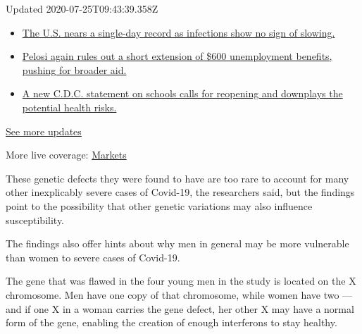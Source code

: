 Updated 2020-07-25T09:43:39.358Z

\begin{itemize}
\tightlist
\item
  \href{https://www.nytimes3xbfgragh.onion/2020/07/24/world/coronavirus-covid-19.html?action=click\&pgtype=Article\&state=default\&module=styln-coronavirus-national\&region=MAIN_CONTENT_1\&context=storylines_live_updates\#link-4331c0b7}{The
  U.S. nears a single-day record as infections show no sign of slowing.}
\item
  \href{https://www.nytimes3xbfgragh.onion/2020/07/24/world/coronavirus-covid-19.html?action=click\&pgtype=Article\&state=default\&module=styln-coronavirus-national\&region=MAIN_CONTENT_1\&context=storylines_live_updates\#link-625c8263}{Pelosi
  again rules out a short extension of \$600 unemployment benefits,
  pushing for broader aid.}
\item
  \href{https://www.nytimes3xbfgragh.onion/2020/07/24/world/coronavirus-covid-19.html?action=click\&pgtype=Article\&state=default\&module=styln-coronavirus-national\&region=MAIN_CONTENT_1\&context=storylines_live_updates\#link-6ec043c9}{A
  new C.D.C. statement on schools calls for reopening and downplays the
  potential health risks.}
\end{itemize}

\href{https://www.nytimes3xbfgragh.onion/2020/07/24/world/coronavirus-covid-19.html?action=click\&pgtype=Article\&state=default\&module=styln-coronavirus-national\&region=MAIN_CONTENT_1\&context=storylines_live_updates}{See
more updates}

More live coverage:
\href{https://www.nytimes3xbfgragh.onion/live/2020/07/24/business/stock-market-updates-coronavirus?action=click\&pgtype=Article\&state=default\&module=styln-coronavirus-national\&region=MAIN_CONTENT_1\&context=storylines_live_updates}{Markets}

These genetic defects they were found to have are too rare to account
for many other inexplicably severe cases of Covid-19, the researchers
said, but the findings point to the possibility that other genetic
variations may also influence susceptibility.

The findings also offer hints about why men in general may be more
vulnerable than women to severe cases of Covid-19.

The gene that was flawed in the four young men in the study is located
on the X chromosome. Men have one copy of that chromosome, while women
have two --- and if one X in a woman carries the gene defect, her other
X may have a normal form of the gene, enabling the creation of enough
interferons to stay healthy.


